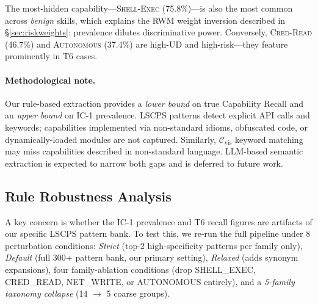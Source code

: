 The most-hidden capability---\textsc{Shell-Exec} (75.8\%)---is also the
most common across \emph{benign} skills, which explains the RWM weight
inversion described in \S\ref{sec:riskweights}:
prevalence dilutes discriminative power.
Conversely, \textsc{Cred-Read} (46.7\%) and \textsc{Autonomous} (37.4\%)
are high-UD and high-risk---they feature prominently in T6 cases.


\paragraph{Methodological note.}
Our rule-based extraction provides a \emph{lower bound} on true Capability Recall
and an \emph{upper bound} on IC-1 prevalence.
LSCPS patterns detect explicit API calls and keywords; capabilities implemented
via non-standard idioms, obfuscated code, or dynamically-loaded modules are not
captured. Similarly, $\mathcal{C}_{\text{vis}}$ keyword matching may
miss capabilities described in non-standard language.
LLM-based semantic extraction is expected to narrow both gaps and is deferred to
future work.

\subsection{Rule Robustness Analysis}
\label{sec:robustness}

A key concern is whether the IC-1 prevalence and T6 recall figures
are artifacts of our specific LSCPS pattern bank.
To test this, we re-run the full pipeline under 8 perturbation conditions:
\emph{Strict} (top-2 high-specificity patterns per family only),
\emph{Default} (full 300+ pattern bank, our primary setting),
\emph{Relaxed} (adds synonym expansions), four family-ablation conditions
(drop SHELL\_EXEC, CRED\_READ, NET\_WRITE, or AUTONOMOUS entirely),
and a \emph{5-family taxonomy collapse} (14 $\to$ 5 coarse groups).

